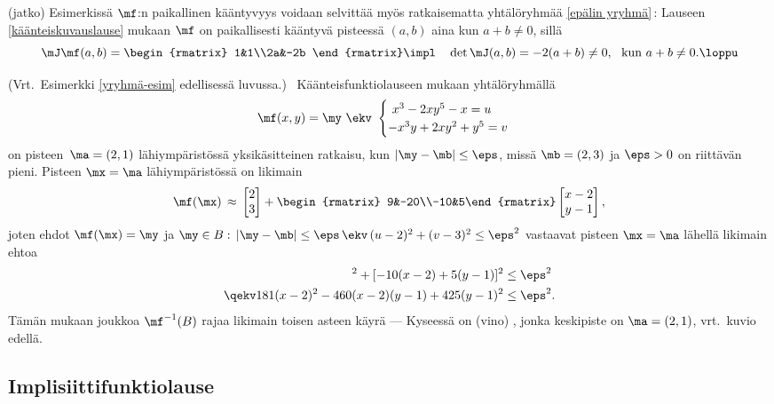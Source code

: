 \jatko\jatko \begin{Exa} (jatko) Esimerkissä $\mf$:n paikallinen kääntyvyys voidaan selvittää
myös ratkaisematta yhtälöryhmää \eqref{epälin yryhmä}\,: Lauseen \ref{käänteiskuvauslause}
mukaan $\mf$ on paikallisesti kääntyvä pisteessä $(a,b)$ aina kun $a+b \ne 0$, sillä
\[
\mJ\mf(a,b) = \begin{rmatrix} 1&1\\2a&-2b \end{rmatrix} 
              \impl\quad \det\mJ(a,b)=-2(a+b) \neq 0,\ \ \text{kun}\ a+b \neq 0. \loppu
\]
\end{Exa} \seur
\begin{Exa} (Vrt.\ Esimerkki \ref{yryhmä-esim} edellisessä luvussa.) \, Käänteisfunktiolauseen
mukaan yhtälöryhmällä
\[
\mf(x,y)=\my \ \ekv \ \begin{cases}
\ x^3-2xy^5-x= u \\
-x^3y+2xy^2+y^5= v
\end{cases}
\]
on pisteen $\,\ma=(2,1)$ lähiympäristössä yksikäsitteinen ratkaisu, kun $|\my-\mb|\le\eps$,
missä $\mb=(2,3)$ ja $\eps>0$ on riittävän pieni. Pisteen $\mx=\ma$ lähiympäristössä on
likimain
\[
\mf(\mx) \,\approx\, \begin{bmatrix} 2\\3 \end{bmatrix}
 + \begin{rmatrix} 9&-20\\-10&5\end{rmatrix} \begin{bmatrix} x-2\\y-1 \end{bmatrix},
\]
joten ehdot $\mf(\mx)=\my$ ja $\my \in B:\,|\my-\mb|\le\eps\,\ekv\,(u-2)^2+(v-3)^2 \le \eps^2$
vastaavat pisteen $\mx=\ma$ lähellä likimain ehtoa
\begin{align*}
[9(x-2)-20(y-1)]^2+[-10(x-2)+5(y-1)]^2    &\le \eps^2 \\
\qekv 181(x-2)^2-460(x-2)(y-1)+425(y-1)^2 &\le \eps^2.
\end{align*}
Tämän mukaan joukkoa $\mf^{-1}(B)$ rajaa likimain toisen asteen käyrä --- Kyseessä on
%
(vino) , jonka keskipiste on $\ma=(2,1)$, vrt.\ kuvio edellä. \loppu
\end{Exa}

\subsection*{Implisiittifunktiolause}

